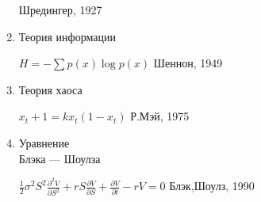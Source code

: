 \documentclass[12pt]{article}
\begin{document}
\begin{enumerate}
\begin{minipage}[t]{100mm}
    \hfill Шредингер, 1927 \end{minipage}
 \item Теория информации \hfill
  \begin{minipage}[t]{100mm} $H = - \sum p(x)\log p(x)$ \hfill Шеннон, 1949
   \end{minipage}
 \item Теория хаоса  \hfill \begin{minipage}[t]{100mm} $x_t+1 = kx_t(1-x_t)$  \hfill Р.Мэй, 1975 \end{minipage}
   \item \begin{minipage}[t]{45mm} Уравнение \\Блэка — Шоулза\\ \end{minipage}
  \hfill 
 \begin{minipage}[t]{100mm}  $\frac{1}{2}\sigma^2 S^2 \frac{\partial^2 V}{\partial S^2}+rS \frac{\partial V}{\partial S}+\frac{\partial V}{\partial t}-rV = 0$ \hfill Блэк,Шоулз, 1990 \end{minipage}
\end{enumerate}
\end{document}
